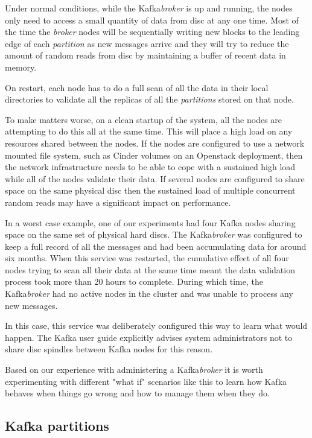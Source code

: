 \documentclass{article}
\newcommand{\openstack} {Openstack\xspace}
\newcommand{\kafka} {Kafka\xspace}
\newcommand{\kfbroker} {\textit{broker}\xspace}
\newcommand{\kfpartition} {\textit{partition}\xspace}
\newcommand{\kfpartitions} {\textit{partitions}\xspace}
\begin{document}
Under normal conditions, while the \kafka \kfbroker is up and running, the nodes only need to access a small quantity of data from disc at any one time. 
Most of the time the \kfbroker nodes will be sequentially writing new blocks to the leading edge of each \kfpartition as new messages arrive and they will try to reduce the amount of random reads from disc by maintaining a buffer of recent data in memory.

On restart, each node has to do a full scan of all the data in their local directories to validate all the replicas of all the \kfpartitions stored on that node.

To make matters worse, on a clean startup of the system, all the nodes are attempting to do this all at the same time. This will place a high load on any resources shared between the nodes.
If the nodes are configured to use a network mounted file system, such as Cinder volumes on an \openstack deployment, then the network infrastructure needs to be able to cope with a sustained high load while all of the nodes validate their data.
If several nodes are configured to share space on the same physical disc then the sustained load of multiple concurrent random reads may have a significant impact on performance.

In a worst case example, one of our experiments had four \kafka nodes sharing space on the same set of physical hard discs. The \kafka \kfbroker was configured to keep a full record of all the messages and had been accumulating data for around six months.
When this service was restarted, the cumulative effect of all four nodes trying to scan all their data at the same time meant the data validation process took more than 20 hours to complete.
During which time, the \kafka \kfbroker had no active nodes in the cluster and was unable to process any new messages.

In this case, this service was deliberately configured this way to learn what would happen.
The \kafka user guide explicitly advises system administrators not to share disc spindles between \kafka nodes for this reason.

Based on our experience with administering a \kafka \kfbroker it is worth experimenting with different "what if" scenarios like this to learn how \kafka behaves when things go wrong and how to manage them when they do.

\subsection{Kafka partitions}
\label{kafka-partitions}
\end{document}
